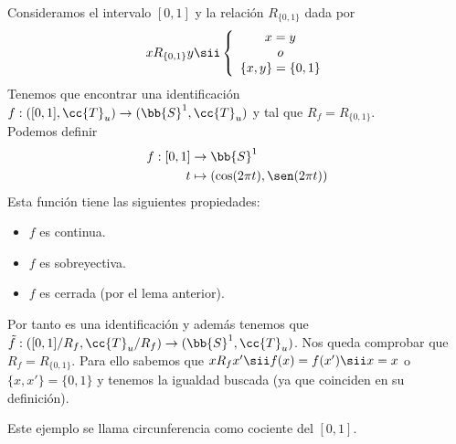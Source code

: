 \begin{ejemplo}
    Consideramos el intervalo $[0,1]$ y la relación $R_{\{0,1\}}$ dada por 
    \begin{align*}
        xR_{\{0,1\}} y \sii \left\{
        \begin{array}{c}
            x=y\\
            o\\
            \{x,y\}=\{0,1\}
        \end{array}
        \right.
    \end{align*}
    Tenemos que encontrar una identificación $f:([0,1], \cc{T}_u)\to (\bb{S}^1, \cc{T}_u)$ y tal que $R_f=R_{\{0,1\}}$.\\

    Podemos definir
    \begin{align*}
        f:[0,1]&\to \bb{S}^1\\
        t &\mapsto (\cos(2\pi t), \sen (2\pi t))
    \end{align*}
    Esta función tiene las siguientes propiedades:
    \begin{itemize}
        \item $f$ es continua.
        \item $f$ es sobreyectiva.
        \item $f$ es cerrada (por el lema anterior).
    \end{itemize}
    Por tanto es una identificación y además tenemos que $\tilde{f}:([0,1]/R_f, \cc{T}_u/R_f)\to (\bb{S}^1, \cc{T}_u)$. Nos queda comprobar que $R_f=R_{\{0,1\}}$. Para ello sabemos que $xR_fx' \sii f(x)=f(x')\sii x=x$ o $\{x,x'\}=\{0,1\}$ y tenemos la igualdad buscada (ya que coinciden en su definición). 

    Este ejemplo se llama circunferencia como cociente del $[0,1]$.
    \endsquare
\end{ejemplo}

